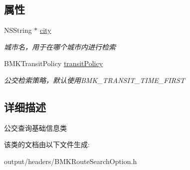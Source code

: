 \subsection*{属性}
\begin{DoxyCompactItemize}
\item 
\hypertarget{interface_b_m_k_transit_route_plan_option_ad3060cccd7cae43c4564a42f19b972aa}{}N\+S\+String $\ast$ \hyperlink{interface_b_m_k_transit_route_plan_option_ad3060cccd7cae43c4564a42f19b972aa}{city}\label{interface_b_m_k_transit_route_plan_option_ad3060cccd7cae43c4564a42f19b972aa}

\begin{DoxyCompactList}\small\item\em 城市名，用于在哪个城市内进行检索 \end{DoxyCompactList}\item 
\hypertarget{interface_b_m_k_transit_route_plan_option_a78e87e470653062316a53e6e8e5399e5}{}B\+M\+K\+Transit\+Policy \hyperlink{interface_b_m_k_transit_route_plan_option_a78e87e470653062316a53e6e8e5399e5}{transit\+Policy}\label{interface_b_m_k_transit_route_plan_option_a78e87e470653062316a53e6e8e5399e5}

\begin{DoxyCompactList}\small\item\em 公交检索策略，默认使用\+B\+M\+K\+\_\+\+T\+R\+A\+N\+S\+I\+T\+\_\+\+T\+I\+M\+E\+\_\+\+F\+I\+R\+S\+T \end{DoxyCompactList}\end{DoxyCompactItemize}


\subsection{详细描述}
公交查询基础信息类 

该类的文档由以下文件生成\+:\begin{DoxyCompactItemize}
\item 
output/headers/B\+M\+K\+Route\+Search\+Option.\+h\end{DoxyCompactItemize}
